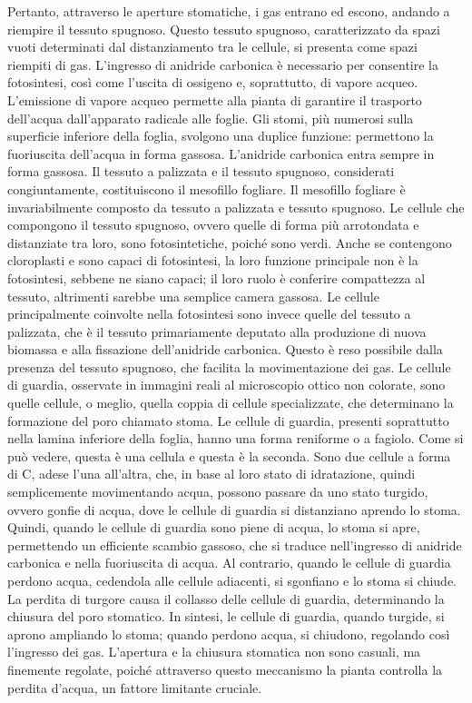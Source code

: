 \documentclass[11pt, a4paper]{article}
\begin{document}
\begin{spacing}{1}
Pertanto, attraverso le aperture stomatiche, i gas entrano ed escono, andando a riempire il tessuto spugnoso. Questo tessuto spugnoso, caratterizzato da spazi vuoti determinati dal distanziamento tra le cellule, si presenta come spazi riempiti di gas. L'ingresso di anidride carbonica è necessario per consentire la fotosintesi, così come l'uscita di ossigeno e, soprattutto, di vapore acqueo. L'emissione di vapore acqueo permette alla pianta di garantire il trasporto dell'acqua dall'apparato radicale alle foglie. Gli stomi, più numerosi sulla superficie inferiore della foglia, svolgono una duplice funzione: permettono la fuoriuscita dell'acqua in forma gassosa.
L'anidride carbonica entra sempre in forma gassosa. Il tessuto a palizzata e il tessuto spugnoso, considerati congiuntamente, costituiscono il mesofillo fogliare. Il mesofillo fogliare è invariabilmente composto da tessuto a palizzata e tessuto spugnoso. Le cellule che compongono il tessuto spugnoso, ovvero quelle di forma più arrotondata e distanziate tra loro, sono fotosintetiche, poiché sono verdi.
Anche se contengono cloroplasti e sono capaci di fotosintesi, la loro funzione principale non è la fotosintesi, sebbene ne siano capaci; il loro ruolo è conferire compattezza al tessuto, altrimenti sarebbe una semplice camera gassosa. Le cellule principalmente coinvolte nella fotosintesi sono invece quelle del tessuto a palizzata, che è il tessuto primariamente deputato alla produzione di nuova biomassa e alla fissazione dell'anidride carbonica. Questo è reso possibile dalla presenza del tessuto spugnoso, che facilita la movimentazione dei gas. Le cellule di guardia, osservate in immagini reali al microscopio ottico non colorate, sono quelle cellule, o meglio, quella coppia di cellule specializzate, che determinano la formazione del poro chiamato stoma. Le cellule di guardia, presenti soprattutto nella lamina inferiore della foglia, hanno una forma reniforme o a fagiolo. Come si può vedere, questa è una cellula e questa è la seconda. Sono due cellule a forma di C, adese l'una all'altra, che, in base al loro stato di idratazione, quindi semplicemente movimentando acqua, possono passare da uno stato turgido, ovvero gonfie di acqua, dove le cellule di guardia si distanziano aprendo lo stoma. Quindi, quando le cellule di guardia sono piene di acqua, lo stoma si apre, permettendo un efficiente scambio gassoso, che si traduce nell'ingresso di anidride carbonica e nella fuoriuscita di acqua.
Al contrario, quando le cellule di guardia perdono acqua, cedendola alle cellule adiacenti, si sgonfiano e lo stoma si chiude. La perdita di turgore causa il collasso delle cellule di guardia, determinando la chiusura del poro stomatico. In sintesi, le cellule di guardia, quando turgide, si aprono ampliando lo stoma; quando perdono acqua, si chiudono, regolando così l'ingresso dei gas. L'apertura e la chiusura stomatica non sono casuali, ma finemente regolate, poiché attraverso questo meccanismo la pianta controlla la perdita d'acqua, un fattore limitante cruciale.

\end{spacing}
\end{document}
